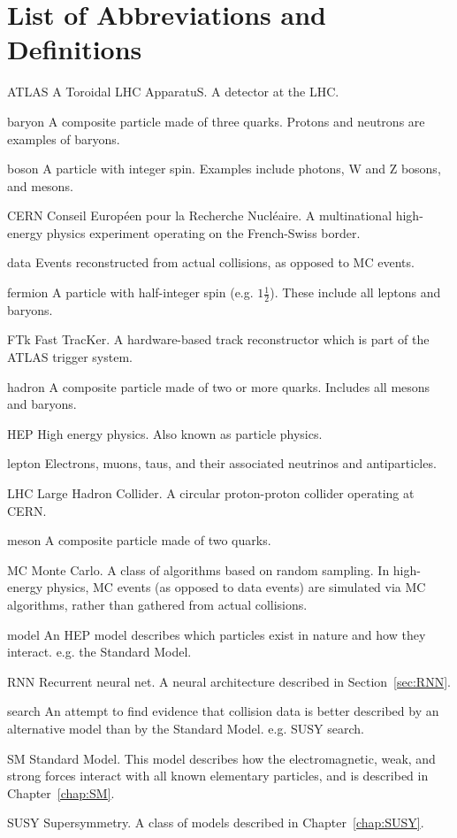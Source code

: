 \chapter*{List of Abbreviations and Definitions}

\begin{symbollist*}
\item[ATLAS] A Toroidal LHC ApparatuS. A detector at the LHC.
\item[baryon] A composite particle made of three quarks. Protons and neutrons are examples of baryons.
\item[boson] A particle with integer spin. Examples include photons, W and Z bosons, and mesons.
\item[CERN] Conseil Européen pour la Recherche Nucléaire. A multinational high-energy physics experiment operating on the French-Swiss border.
\item[data] Events reconstructed from actual collisions, as opposed to MC events.
\item[fermion] A particle with half-integer spin (e.g. $1\frac{1}{2}$). These include all leptons and baryons.
\item[FTk] Fast TracKer. A hardware-based track reconstructor which is part of the ATLAS trigger system.
\item[hadron] A composite particle made of two or more quarks. Includes all mesons and baryons.
\item[HEP] High energy physics. Also known as particle physics.
\item[lepton] Electrons, muons, taus, and their associated neutrinos and antiparticles.
\item[LHC] Large Hadron Collider. A circular proton-proton collider operating at CERN.
\item[meson] A composite particle made of two quarks.
\item[MC] Monte Carlo. A class of algorithms based on random sampling. In high-energy physics, MC events (as opposed to data events) are simulated via MC algorithms, rather than gathered from actual collisions.
\item[model] An HEP model describes which particles exist in nature and how they interact. e.g. the Standard Model.
\item[RNN] Recurrent neural net. A neural architecture described in Section~\ref{sec:RNN}.
\item[search] An attempt to find evidence that collision data is better described by an alternative model than by the Standard Model. e.g. SUSY search.
\item[SM] Standard Model. This model describes how the electromagnetic, weak, and strong forces interact with all known elementary particles, and is described in Chapter~\ref{chap:SM}.
\item[SUSY] Supersymmetry. A class of models described in Chapter~\ref{chap:SUSY}.
\end{symbollist*}